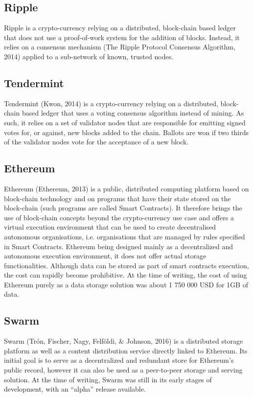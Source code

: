 \documentclass{tnreport}
\begin{document}
\subsection{Ripple}

Ripple is a crypto-currency relying on a distributed, block-chain based ledger that does not use a proof-of-work system for the addition of blocks. Instead, it relies on a consensus mechanism (The Ripple Protocol Consensus Algorithm, 2014) applied to a sub-network of known, trusted nodes.

\subsection{Tendermint}

Tendermint (Kwon, 2014) is a crypto-currency relying on a distributed, block-chain based ledger that uses a voting consensus algorithm instead of mining. As such, it relies on a set of validator nodes that are responsible for emitting signed votes for, or against, new blocks added to the chain. Ballots are won if two thirds of the validator nodes vote for the acceptance of a new block.

\subsection{Ethereum}

Ethereum (Ethereum, 2013) is a public, distributed computing platform based on block-chain technology and on programs that have their state stored on the block-chain (such programs are called Smart Contracts). It therefore brings the use of block-chain concepts beyond the crypto-currency use case and offers a virtual execution environment that can be used to create decentralised autonomous organisations, i.e. organisations that are managed by rules specified in Smart Contracts.
Ethereum being designed mainly as a decentralized and autonomous execution environment, it does not offer actual storage functionalities. Although data can be stored as part of smart contracts execution, the cost can rapidly become prohibitive. At the time of writing, the cost of using Ethereum purely as a data storage solution was about 1 750 000 USD for 1GB of data.

\subsection{Swarm}

Swarm (Trón, Fischer, Nagy, Felföldi, \& Johnson, 2016) is a distributed storage platform as well as a content distribution service directly linked to Ethereum. Its initial goal is to serve as a decentralized and redundant store for Ethereum’s public record, however it can also be used as a peer-to-peer storage and serving solution.
At the time of writing, Swarm was still in its early stages of development, with an “alpha” release available.
\end{document}
